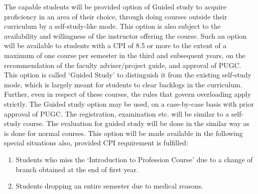 The capable students will be provided option of Guided study to acquire proficiency in an area of their choice, through doing courses outside their curriculum by a self-study-like mode. This option is also subject to the availability and willingness of the instructor offering the course. Such an option will be available to students with a CPI of 8.5 or more to the extent of a maximum of one course per semester in the third and subsequent years, on the recommendation of the faculty adviser/project guide, and approval of PUGC. This option is called ‘Guided Study' to distinguish it from the existing self-study mode, which is largely meant for students to clear backlogs in the curriculum. Further, even in respect of these courses, the rules that govern overloading apply strictly. The Guided study option may be used, on a case-by-case basis with prior approval of PUGC. The registration, examination etc. will be similar to a self-study course. The evaluation for guided study will be done in the similar way as is done for normal courses. This option will be made available in the following special situations also, provided CPI requirement is fulfilled: 

\begin{enumerate}
    \item Students who miss the ‘Introduction to Profession Course' due to a change of branch obtained at the end of first year. 
    \item Students dropping an entire semester due to medical reasons. 
\end{enumerate}